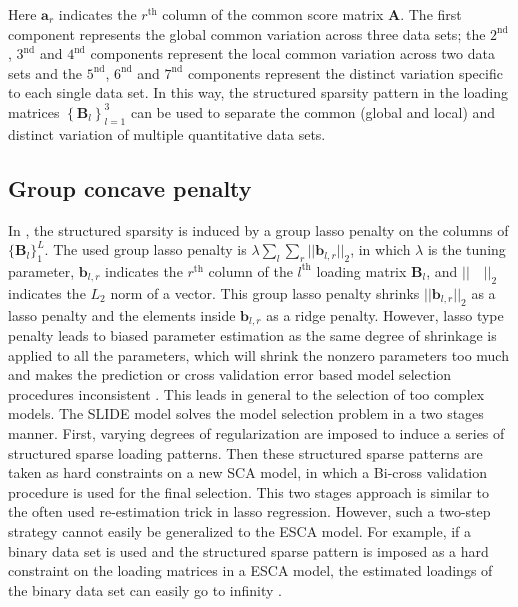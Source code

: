 Here $\mathbf{a}_r$ indicates the $r^{\text{th}}$ column of the common score matrix $\mathbf{A}$. The first component represents the global common variation across three data sets; the $2^{\text{nd}}$, $3^{\text{nd}}$ and $4^{\text{nd}}$ components represent the local common variation across two data sets and the $5^{\text{nd}}$, $6^{\text{nd}}$ and $7^{\text{nd}}$ components represent the distinct variation specific to each single data set. In this way, the structured sparsity pattern in the loading matrices $\left\{\mathbf{B}_l \right\}_{l=1}^{3}$ can be used to separate the common (global and local) and distinct variation of multiple quantitative data sets.

\subsection{Group concave penalty}
In \cite{van2011flexible,acar2015data,gaynanova2017structural}, the structured sparsity is induced by a group lasso penalty on the columns of $\{ \mathbf{B}_l \}_{1}^{L}$. The used group lasso penalty is $\lambda \sum_{l}\sum_{r} ||\mathbf{b}_{l,r}||_{2}$, in which $\lambda$ is the tuning parameter, $\mathbf{b}_{l,r}$ indicates the $r^{\text{th}}$ column of the $l^{\text{th}}$ loading matrix $\mathbf{B}_l$, and $||\quad||_{2}$ indicates the $L_2$ norm of a vector. This group lasso penalty shrinks $||\mathbf{b}_{l,r}||_{2}$ as a lasso penalty and the elements inside $\mathbf{b}_{l,r}$ as a ridge penalty. However, lasso type penalty leads to biased parameter estimation as the same degree of shrinkage is applied to all the parameters, which will shrink the nonzero parameters too much and makes the prediction or cross validation error based model selection procedures inconsistent \cite{meinshausen2006high,leng2006note}. This leads in general to the selection of too complex models. The SLIDE model \cite{gaynanova2017structural} solves the model selection problem in a two stages manner. First, varying degrees of regularization are imposed to induce a series of structured sparse loading patterns. Then these structured sparse patterns are taken as hard constraints on a new SCA model, in which a Bi-cross validation procedure \cite{perry2009cross} is used for the final selection. This two stages approach is similar to the often used re-estimation trick in lasso regression. However, such a two-step strategy cannot easily be generalized to the ESCA model. For example, if a binary data set is used and the structured sparse pattern is imposed as a hard constraint on the loading matrices in a ESCA model, the estimated loadings of the binary data set can easily go to infinity \cite{groenen2016multinomial,song2018generalized}.

